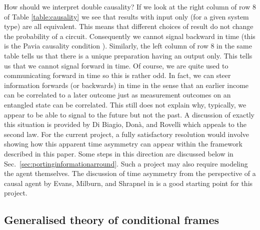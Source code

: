 \documentclass[10pt]{article}
\begin{document}
How should we interpret double causality?  If we look at the right column of row 8 of Table \ref{table:causality} we see that results with input only (for a given system type) are all equivalent.  This means that different choices of result do not change the probability of a circuit.  Consequently we cannot signal backward in time (this is the Pavia causality condition \cite{chiribella2010informational}).  Similarly, the left column of row 8 in the same table tells us that there is a unique preparation having an output only.  This tells us that we cannot signal forward in time.  Of course, we are quite used to communicating forward in time so this is rather odd.  In fact, we can steer information forwards (or backwards) in time in the sense that an earlier income can be correlated to a later outcome just as measurement outcomes on an entangled state can be correlated.   This still does not explain why, typically, we appear to be able to signal to the future but not the past.  A discussion of exactly this situation is provided by Di Biagio, Don\`a, and Rovelli \cite{di2020quantum} which appeals to the second law.  For the current project, a fully satisfactory resolution would involve showing how this apparent time asymmetry can appear within the framework described in this paper.  Some steps in this direction are discussed below in Sec.\ \ref{sec:portinginformationarround}.   Such a project may also require modeling the agent themselves.  The discussion of time asymmetry from the perspective of a causal agent by Evans, Milburn, and Shrapnel in \cite{evans2021causal} is a good starting point for this project. 




\subsection{Generalised theory of conditional frames}\label{sec:generalisedtheoryofconditionalframes}
\end{document}

